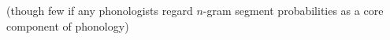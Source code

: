 \label{gradience}

(though few if any phonologists regard $n$-gram segment probabilities as a core component of phonology)





